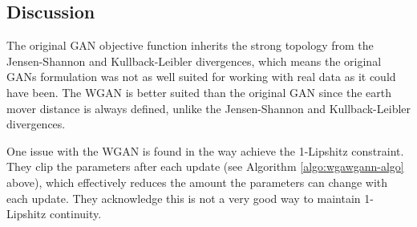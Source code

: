 \subsection{Discussion}

The original GAN objective function inherits the strong topology from
the Jensen-Shannon and Kullback-Leibler divergences, which means the
original GANs formulation was not as well suited for working with real
data as it could have been.  The WGAN is better suited than the
original GAN since the earth mover distance is always defined, unlike
the Jensen-Shannon and Kullback-Leibler divergences.

One issue with the WGAN is found in the way \cite{ref:arjovsky-2017}
achieve the 1-Lipshitz constraint.  They clip the parameters after
each update (see Algorithm \ref{algo:wgawgann-algo} above), which
effectively reduces the amount the parameters can change with each
update.  They acknowledge this is not a very good way to maintain
1-Lipshitz continuity.

